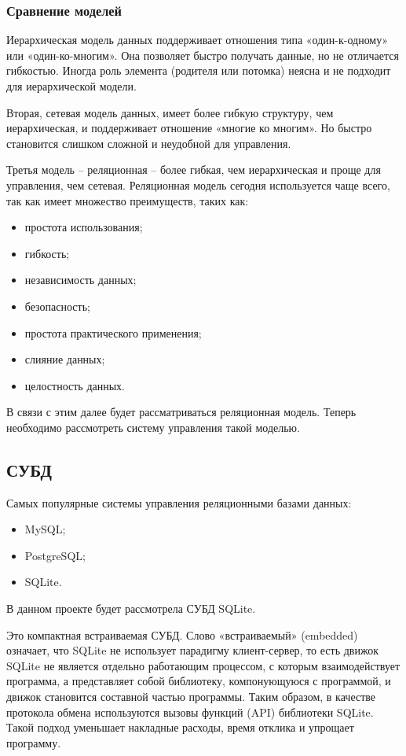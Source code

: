 \subsubsection{Сравнение моделей}
 \setcounter{subsubsection}{4}

Иерархическая модель данных поддерживает отношения типа «один-к-одному» или «один-ко-многим». Она позволяет быстро получать данные, но не отличается гибкостью. Иногда роль элемента (родителя или потомка) неясна и не подходит для иерархической модели.

Вторая, сетевая модель данных, имеет более гибкую структуру, чем иерархическая, и поддерживает отношение «многие ко многим». Но быстро становится слишком сложной и неудобной для управления.

Третья модель – реляционная – более гибкая, чем иерархическая и проще для управления, чем сетевая. Реляционная модель сегодня используется чаще всего, так как имеет множество преимуществ, таких как:

\begin{itemize}
	\item простота использования;
	\item гибкость;
	\item независимость данных;
	\item безопасность;
	\item простота практического применения;
	\item слияние данных;
	\item целостность данных.
\end{itemize}

В связи с этим далее будет рассматриваться реляционная модель. Теперь необходимо рассмотреть систему управления такой моделью.

\subsection{СУБД}%
 \setcounter{subsection}{4}

Самых популярные системы управления реляционными базами данных:
\begin{itemize}
	\item MySQL;
	\item PostgreSQL; 
	\item SQLite.
\end{itemize}

В данном проекте будет рассмотрела СУБД SQLite.

Это компактная встраиваемая СУБД. Слово «встраиваемый» (embedded) означает, что SQLite не использует парадигму клиент-сервер, то есть движок SQLite не является отдельно работающим процессом, с которым взаимодействует программа, а представляет собой библиотеку, компонующуюся с программой, и движок становится составной частью программы. Таким образом, в качестве протокола обмена используются вызовы функций (API) библиотеки SQLite. Такой подход уменьшает накладные расходы, время отклика и упрощает программу.

